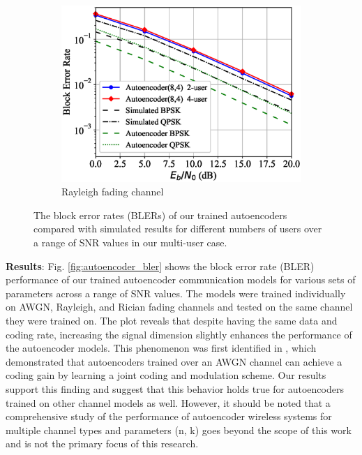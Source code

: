 \begin{figure}[!tp]
\begin{subfigure}{0.28\linewidth}
		\includegraphics[width=\linewidth]{figs/multi_autoencoder_bler_rayleigh}
		\caption{Rayleigh fading channel}	
	\end{subfigure}
	\caption{The block error rates (BLERs) of our trained autoencoders compared with simulated results for different numbers of users over a range of SNR values in our multi-user case.}
	\label{fig:multi_autoencoder_bler}
\end{figure}

\textbf{Results}: Fig. \ref{fig:autoencoder_bler} shows the block error rate (BLER) performance of our trained autoencoder communication models for various sets of parameters across a range of SNR values. The models were trained individually on AWGN, Rayleigh, and Rician fading channels and tested on the same channel they were trained on.
The plot reveals that despite having the same data and coding rate, increasing the signal dimension slightly enhances the performance of the autoencoder models. This phenomenon was first identified in \cite{o2017introduction}, which demonstrated that autoencoders trained over an AWGN channel can achieve a coding gain by learning a joint coding and modulation scheme. Our results support this finding and suggest that this behavior holds true for autoencoders trained on other channel models as well. However, it should be noted that a comprehensive study of the performance of autoencoder wireless systems for multiple channel types and parameters (n, k) goes beyond the scope of this work and is not the primary focus of this research.


